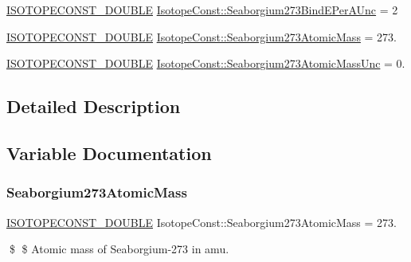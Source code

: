 \begin{DoxyCompactItemize}
\mbox{\hyperlink{group___isotope_const-_macros_ga8f45a7272ce02c0b4c65c44636ed719a}{I\+S\+O\+T\+O\+P\+E\+C\+O\+N\+S\+T\+\_\+\+D\+O\+U\+B\+LE}} \mbox{\hyperlink{group___isotope_const-_seaborgium-_sg273_gae168b849debbdcb16a09ae7d3a9d85ff}{Isotope\+Const\+::\+Seaborgium273\+Bind\+E\+Per\+A\+Unc}} = 2
\item 
\mbox{\hyperlink{group___isotope_const-_macros_ga8f45a7272ce02c0b4c65c44636ed719a}{I\+S\+O\+T\+O\+P\+E\+C\+O\+N\+S\+T\+\_\+\+D\+O\+U\+B\+LE}} \mbox{\hyperlink{group___isotope_const-_seaborgium-_sg273_gac3587e0acd16861b46d131477f2a1a27}{Isotope\+Const\+::\+Seaborgium273\+Atomic\+Mass}} = 273.
\item 
\mbox{\hyperlink{group___isotope_const-_macros_ga8f45a7272ce02c0b4c65c44636ed719a}{I\+S\+O\+T\+O\+P\+E\+C\+O\+N\+S\+T\+\_\+\+D\+O\+U\+B\+LE}} \mbox{\hyperlink{group___isotope_const-_seaborgium-_sg273_ga180d6c4534265638ce948922810ca166}{Isotope\+Const\+::\+Seaborgium273\+Atomic\+Mass\+Unc}} = 0.
\end{DoxyCompactItemize}


\subsection{Detailed Description}


\subsection{Variable Documentation}
\mbox{\label{group___isotope_const-_seaborgium-_sg273_gac3587e0acd16861b46d131477f2a1a27}} 
\subsubsection{\texorpdfstring{Seaborgium273\+Atomic\+Mass}{Seaborgium273AtomicMass}}
{\footnotesize\ttfamily \mbox{\hyperlink{group___isotope_const-_macros_ga8f45a7272ce02c0b4c65c44636ed719a}{I\+S\+O\+T\+O\+P\+E\+C\+O\+N\+S\+T\+\_\+\+D\+O\+U\+B\+LE}} Isotope\+Const\+::\+Seaborgium273\+Atomic\+Mass = 273.}

\$ \$ Atomic mass of Seaborgium-\/273 in amu. \mbox{\label{group___isotope_const-_seaborgium-_sg273_ga180d6c4534265638ce948922810ca166}} 
